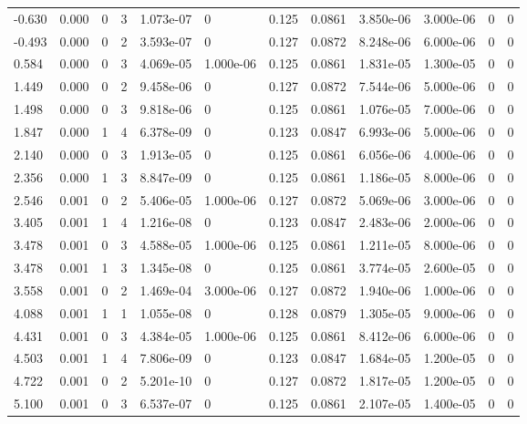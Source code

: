 \documentclass[preview]{standalone}
\begin{document}
{{\begin{tabular}{L{1.2cm}C{1.2cm} C{0.3cm}C{0.5cm} C{1.4cm}C{1.4cm} C{1.4cm}C{1.4cm} C{1.6cm}C{1.6cm} C{1.6cm}C{1.6cm}}
  -0.630  &  0.000  & 0     &  3 &  1.073e-07  & 0  &  0.125&   0.0861& 3.850e-06 & 3.000e-06   &  0 & 0  \\ 
  -0.493  &  0.000  & 0     &  2 &  3.593e-07  & 0  &  0.127&   0.0872& 8.248e-06 & 6.000e-06   &  0 & 0  \\ 
  0.584  &  0.000  & 0     &  3 &  4.069e-05  & 1.000e-06  &  0.125&   0.0861& 1.831e-05 & 1.300e-05   &  0 & 0  \\ 
  1.449  &  0.000  & 0     &  2 &  9.458e-06  & 0  &  0.127&   0.0872& 7.544e-06 & 5.000e-06   &  0 & 0  \\ 
  1.498  &  0.000  & 0     &  3 &  9.818e-06  & 0  &  0.125&   0.0861& 1.076e-05 & 7.000e-06   &  0 & 0  \\ 
  1.847  &  0.000  & 1     &  4 &  6.378e-09  & 0  &  0.123&   0.0847& 6.993e-06 & 5.000e-06   &  0 & 0  \\ 
  2.140  &  0.000  & 0     &  3 &  1.913e-05  & 0  &  0.125&   0.0861& 6.056e-06 & 4.000e-06   &  0 & 0  \\ 
  2.356  &  0.000  & 1     &  3 &  8.847e-09  & 0  &  0.125&   0.0861& 1.186e-05 & 8.000e-06   &  0 & 0  \\ 
  2.546  &  0.001  & 0     &  2 &  5.406e-05  & 1.000e-06  &  0.127&   0.0872& 5.069e-06 & 3.000e-06   &  0 & 0  \\ 
  3.405  &  0.001  & 1     &  4 &  1.216e-08  & 0  &  0.123&   0.0847& 2.483e-06 & 2.000e-06   &  0 & 0  \\ 
  3.478  &  0.001  & 0     &  3 &  4.588e-05  & 1.000e-06  &  0.125&   0.0861& 1.211e-05 & 8.000e-06   &  0 & 0  \\ 
  3.478  &  0.001  & 1     &  3 &  1.345e-08  & 0  &  0.125&   0.0861& 3.774e-05 & 2.600e-05   &  0 & 0  \\ 
  3.558  &  0.001  & 0     &  2 &  1.469e-04  & 3.000e-06  &  0.127&   0.0872& 1.940e-06 & 1.000e-06   &  0 & 0  \\ 
  4.088  &  0.001  & 1     &  1 &  1.055e-08  & 0  &  0.128&   0.0879& 1.305e-05 & 9.000e-06   &  0 & 0  \\ 
  4.431  &  0.001  & 0     &  3 &  4.384e-05  & 1.000e-06  &  0.125&   0.0861& 8.412e-06 & 6.000e-06   &  0 & 0  \\ 
  4.503  &  0.001  & 1     &  4 &  7.806e-09  & 0  &  0.123&   0.0847& 1.684e-05 & 1.200e-05   &  0 & 0  \\ 
  4.722  &  0.001  & 0     &  2 &  5.201e-10  & 0  &  0.127&   0.0872& 1.817e-05 & 1.200e-05   &  0 & 0  \\ 
  5.100  &  0.001  & 0     &  3 &  6.537e-07  & 0  &  0.125&   0.0861& 2.107e-05 & 1.400e-05   &  0 & 0  \\ 

\end{tabular}}}
\end{document}
